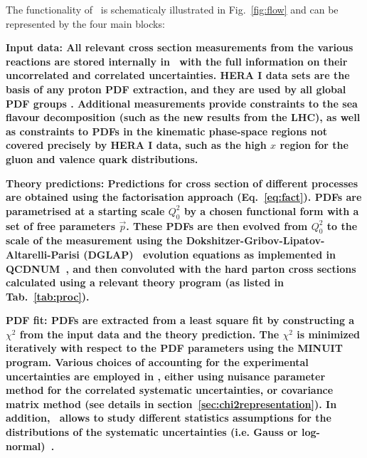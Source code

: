 %
\normalsize
The functionality of \fitter~is schematicaly illustrated in Fig.~\ref{fig:flow} and can be represented by the four main blocks: %

\begin{description}
\item 
\bf {Input data:} \rm  All relevant cross section measurements from the various reactions
are stored internally in \fitter\ with the full information on their uncorrelated and correlated
uncertainties. HERA I data sets are the basis of any proton PDF extraction, and they are used by all global PDF groups \cite{MSTWpdf, CT10pdf, NNPDFpdf, ABMpdf, JRpdf}. Additional measurements provide constraints to the sea flavour decomposition (such as the new results from the LHC), as well as constraints to PDFs in the kinematic phase-space regions not covered precisely by HERA I data, such as the high $x$ region for the gluon and valence quark distributions.
\item
\bf{Theory predictions:} \rm  Predictions for cross section of different processes are obtained using the factorisation approach (Eq.~\ref{eq:fact}). PDFs are parametrised at a starting scale $Q_0^2$  by a chosen functional form with a set of free parameters $\vec{p}$. These PDFs are then evolved from $Q_0^2$ to the scale of the measurement using the 
Dokshitzer-Gribov-Lipatov-Altarelli-Parisi 
(DGLAP)~\cite{Gribov:1972ri, Gribov:1972rt, Lipatov:1974qm,
Dokshitzer:1977sg, Altarelli:1977zs} evolution equations 
as implemented in QCDNUM~\cite{qcdnum}, 
and then convoluted with the hard parton cross sections calculated
using a relevant theory program (as listed in Tab.~\ref{tab:proc}).
\item
\bf{PDF fit:} \rm  PDFs are extracted from a least square fit by constructing a 
$\chi^2$ from the input data and the theory prediction.
The $\chi^2$ is  minimized iteratively 
with respect to the PDF parameters using the MINUIT\cite{minuit} program.
Various choices of accounting for the experimental uncertainties are employed in \fitter, 
either using nuisance parameter method for the correlated systematic uncertainties, 
or covariance matrix method (see details in section~\ref{sec:chi2representation}). In addition, \fitter~allows to study different statistics 
assumptions for the distributions of the systematic uncertainties (i.e. Gauss or log-normal)~\cite{hera-lhc:report2009}.

\end{description}
